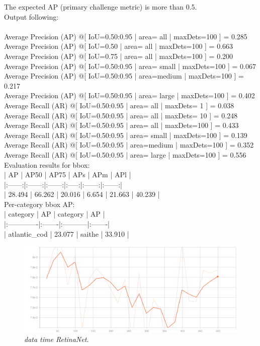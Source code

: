 The expected AP (primary challenge metric) is more than 0.5. \\
Output following: \\
 \\
 Average Precision  (AP) @[ IoU=0.50:0.95 | area=   all | maxDets=100 ] = 0.285 \\
 Average Precision  (AP) @[ IoU=0.50      | area=   all | maxDets=100 ] = 0.663 \\
 Average Precision  (AP) @[ IoU=0.75      | area=   all | maxDets=100 ] = 0.200 \\
 Average Precision  (AP) @[ IoU=0.50:0.95 | area= small | maxDets=100 ] = 0.067 \\
 Average Precision  (AP) @[ IoU=0.50:0.95 | area=medium | maxDets=100 ] = 0.217 \\
 Average Precision  (AP) @[ IoU=0.50:0.95 | area= large | maxDets=100 ] = 0.402 \\
 Average Recall     (AR) @[ IoU=0.50:0.95 | area=   all | maxDets=  1 ] = 0.038 \\
 Average Recall     (AR) @[ IoU=0.50:0.95 | area=   all | maxDets= 10 ] = 0.248 \\
 Average Recall     (AR) @[ IoU=0.50:0.95 | area=   all | maxDets=100 ] = 0.433 \\
 Average Recall     (AR) @[ IoU=0.50:0.95 | area= small | maxDets=100 ] = 0.139 \\
 Average Recall     (AR) @[ IoU=0.50:0.95 | area=medium | maxDets=100 ] = 0.352 \\
 Average Recall     (AR) @[ IoU=0.50:0.95 | area= large | maxDets=100 ] = 0.556 \\
Evaluation results for bbox:  \\
|   AP   |  AP50  |  AP75  |  APs  |  APm   |  APl   | \\
|:------:|:------:|:------:|:-----:|:------:|:------:| \\
| 28.494 | 66.262 | 20.016 | 6.654 | 21.663 | 40.239 | \\
Per-category bbox AP:  \\
| category     | AP     | category   | AP     | \\
|:-------------|:-------|:-----------|:-------| \\
| atlantic\_cod | 23.077 | saithe     | 33.910 |

\begin{figure}[h!]
\begin{center} 
\includegraphics[scale=0.35]{figures/data_time_retinanet_1}
\caption{\small \sl data time RetinaNet. \label{fig:data_time_retinanet}}
\end{center}
\end{figure}

